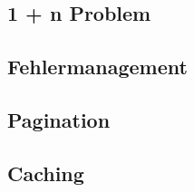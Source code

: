 \subsection{1 + n Problem}

\subsection{Fehlermanagement}

\subsection{Pagination}

\subsection{Caching}
